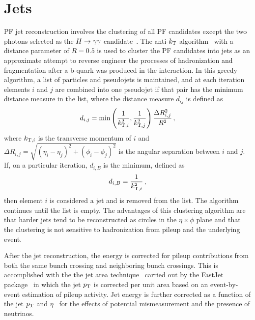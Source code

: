 \section{Jets\label{sec:jets}}

PF jet reconstruction involves the clustering of all PF candidates except the two photons selected
as the $H\to\gamma\gamma$ candidate~\cite{PFPAS2009,CMS-PAS-PFT-10-001}.
The anti-$k_{\rm T}$ algorithm~\cite{Cacciari:2008gp} with a distance parameter of $R = 0.5$ is
used to cluster the PF candidates into jets as an approximate attempt to reverse engineer the
processes of hadronization and fragmentation after a b-quark was produced in the interaction.
In this greedy algorithm, a list of particles and pseudojets is maintained, and at each iteration
elements $i$ and $j$ are combined into one pseudojet if that pair has the minimum distance measure
in the list, where the distance measure $d_{ij}$ is defined as
\begin{equation}
d_{i,j} = \min \left(\frac{1}{k_{{\rm T},i}^2},\frac{1}{k_{{\rm T},j}^2}\right)\frac{\Delta R_{i,j}^2}{R^2} \, ,
\end{equation}
where $k_{{\rm T},i}$ is the transverse momentum of $i$ and $\Delta R_{i,j} = \sqrt{(\eta_i-\eta_j)^2+(\phi_i-\phi_j)^2}$ is the angular separation between $i$ and $j$. If, on a particular iteration,
$d_{i,B}$ is the minimum, defined as
\begin{equation}
d_{i,B} = \frac{1}{k_{{\rm T},i}^2} \, ,
\end{equation}
then element $i$ is considered a jet and is removed from the list. The algorithm continues until the
list is empty.
The advantages of this clustering algorithm are that harder jets tend to be reconstructed as circles
in the $\eta\times\phi$ plane and that the clustering is not sensitive to
hadronization from pileup and the underlying event.

After the jet reconstruction, the energy is corrected for pileup contributions from both the same
bunch crossing and neighboring bunch crossings. This is accomplished with the the
jet area technique~\cite{Cacciari:2007fd} carried out by the FastJet package~\cite{Cacciari:2011ma}
in which the jet $p_{\rm T}$ is corrected per unit area based on an event-by-event estimation of pileup
activity.
Jet energy is further corrected as a function of the jet $p_{\rm T}$ and $\eta$~\cite{JINST6}
for the effects of potential mismeasurement and the presence of neutrinos.


